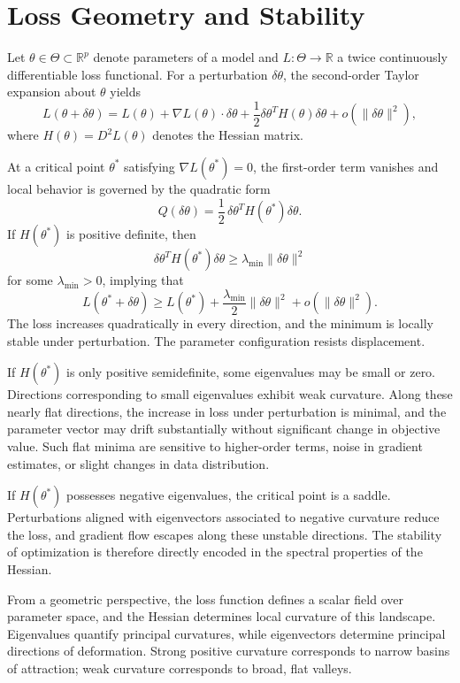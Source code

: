 \documentclass[12pt]{book}
\begin{document}
\section{Loss Geometry and Stability}

Let $\theta \in \Theta \subset \mathbb{R}^p$ denote parameters of a model and $L : \Theta \to \mathbb{R}$ a twice continuously differentiable loss functional. For a perturbation $\delta \theta$, the second-order Taylor expansion about $\theta$ yields
\[
L(\theta + \delta \theta)
=
L(\theta)
+
\nabla L(\theta) \cdot \delta \theta
+
\frac{1}{2}
\delta \theta^{T}
H(\theta)
\delta \theta
+
o(\|\delta \theta\|^2),
\]
where $H(\theta) = D^2 L(\theta)$ denotes the Hessian matrix.

At a critical point $\theta^\ast$ satisfying $\nabla L(\theta^\ast) = 0$, the first-order term vanishes and local behavior is governed by the quadratic form
\[
Q(\delta \theta) = \frac{1}{2}\,\delta \theta^{T} H(\theta^\ast) \delta \theta.
\]
If $H(\theta^\ast)$ is positive definite, then
\[
\delta \theta^{T} H(\theta^\ast) \delta \theta
\ge
\lambda_{\min} \|\delta \theta\|^2
\]
for some $\lambda_{\min} > 0$, implying that
\[
L(\theta^\ast + \delta \theta)
\ge
L(\theta^\ast)
+
\frac{\lambda_{\min}}{2}
\|\delta \theta\|^2
+
o(\|\delta \theta\|^2).
\]
The loss increases quadratically in every direction, and the minimum is locally stable under perturbation. The parameter configuration resists displacement.

If $H(\theta^\ast)$ is only positive semidefinite, some eigenvalues may be small or zero. Directions corresponding to small eigenvalues exhibit weak curvature. Along these nearly flat directions, the increase in loss under perturbation is minimal, and the parameter vector may drift substantially without significant change in objective value. Such flat minima are sensitive to higher-order terms, noise in gradient estimates, or slight changes in data distribution.

If $H(\theta^\ast)$ possesses negative eigenvalues, the critical point is a saddle. Perturbations aligned with eigenvectors associated to negative curvature reduce the loss, and gradient flow escapes along these unstable directions. The stability of optimization is therefore directly encoded in the spectral properties of the Hessian.

From a geometric perspective, the loss function defines a scalar field over parameter space, and the Hessian determines local curvature of this landscape. Eigenvalues quantify principal curvatures, while eigenvectors determine principal directions of deformation. Strong positive curvature corresponds to narrow basins of attraction; weak curvature corresponds to broad, flat valleys.
\end{document}
